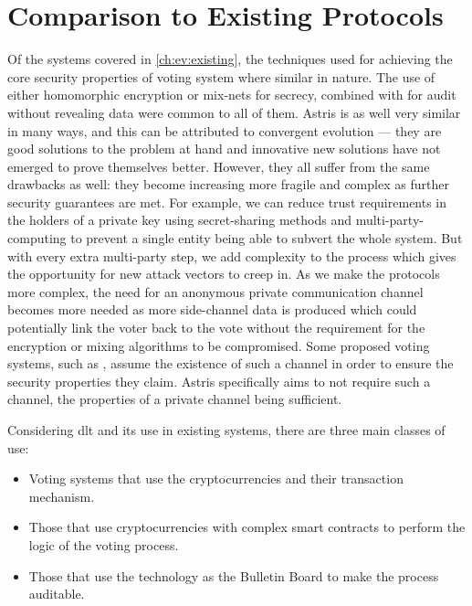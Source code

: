 \section{Comparison to Existing Protocols}
\label{ch:analysis:comparison}

Of the systems covered in \autoref{ch:ev:existing}, the techniques used for achieving the core security properties of voting system where similar in nature. The use of either homomorphic encryption or mix-nets for secrecy, combined with  for audit without revealing data were common to all of them. Astris is as well very similar in many ways, and this can be attributed to convergent evolution --- they are good solutions to the problem at hand and innovative new solutions have not emerged to prove themselves better. However, they all suffer from the same drawbacks as well: they become increasing more fragile and complex as further security guarantees are met. For example, we can reduce trust requirements in the holders of a private key using secret-sharing methods and multi-party-computing to prevent a single entity being able to subvert the whole system. But with every extra multi-party step, we add complexity to the process which gives the opportunity for new attack vectors to creep in. As we make the protocols more complex, the need for an anonymous private communication channel becomes more needed as more side-channel data is produced which could potentially link the voter back to the vote without the requirement for the encryption or mixing algorithms to be compromised. Some proposed voting systems, such as \cite{liuEvotingProtocolBased2017}, assume the existence of such a channel in order to ensure the security properties they claim. Astris specifically aims to not require such a channel, the properties of a private channel being sufficient.

Considering \gls{dlt} and its use in existing systems, there are three main classes of use:

\begin{itemize}
    \item Voting systems that use the cryptocurrencies and their transaction mechanism.
    \item Those that use cryptocurrencies with complex smart contracts to perform the logic of the voting process.
    \item Those that use the technology as the Bulletin Board to make the process auditable.
\end{itemize}

